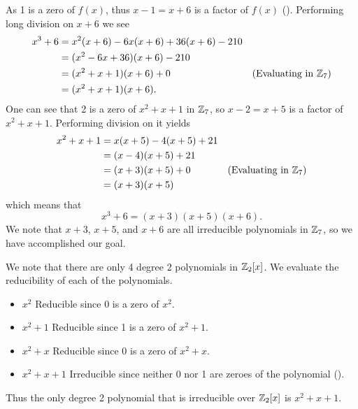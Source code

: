 \begin{questions}
\begin{partquestions}{\roman*}
        \item As 1 is a zero of $f(x)$, thus $x-1 = x+6$ is a factor of $f(x)$ (). Performing long division on $x+6$ we see
        \begin{align*}
            x^3 + 6 &= x^2(x+6) - 6x(x+6) + 36(x+6) - 210\\
            &= (x^2-6x+36)(x+6) - 210\\
            &= (x^2+x+1)(x+6) + 0 & (\text{Evaluating in }\mathbb{Z}_7)\\
            &= (x^2+x+1)(x+6).
        \end{align*}
        One can see that 2 is a zero of $x^2 + x + 1$ in $\mathbb{Z}_7$, so $x - 2 = x+5$ is a factor of $x^2 + x + 1$. Performing division on it yields
        \begin{align*}
            x^2 + x + 1 &= x(x+5) - 4(x+5) + 21\\
            &= (x-4)(x+5) + 21\\
            &= (x+3)(x+5) + 0 & (\text{Evaluating in }\mathbb{Z}_7)\\
            &= (x+3)(x+5)
        \end{align*}
        which means that
        \[
            x^3 + 6 = (x+3)(x+5)(x+6).
        \]
        We note that $x+3$, $x+5$, and $x+6$ are all irreducible polynomials in $\mathbb{Z}_7$, so we have accomplished our goal.
    \end{partquestions}

    \item \begin{partquestions}{\alph*}
        \item We note that there are only 4 degree 2 polynomials in $\mathbb{Z}_2[x]$. We evaluate the reducibility of each of the polynomials.
        \begin{itemize}
            \item $\boxed{x^2}$ Reducible since 0 is a zero of $x^2$.
            \item $\boxed{x^2 + 1}$ Reducible since 1 is a zero of $x^2 + 1$.
            \item $\boxed{x^2+x}$ Reducible since 0 is a zero of $x^2 + x$.
            \item $\boxed{x^2+x+1}$ Irreducible since neither 0 nor 1 are zeroes of the polynomial ().
        \end{itemize}
        Thus the only degree 2 polynomial that is irreducible over $\mathbb{Z}_2[x]$ is $x^2+x+1$.


\end{partquestions}
\end{questions}
